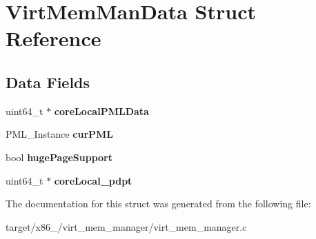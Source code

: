\hypertarget{structVirtMemManData}{}\section{Virt\+Mem\+Man\+Data Struct Reference}
\label{structVirtMemManData}
\subsection*{Data Fields}
\begin{DoxyCompactItemize}
\item 
uint64\+\_\+t $\ast$ {\bfseries core\+Local\+P\+M\+L\+Data}\hypertarget{structVirtMemManData_a468d6712e9cdfa8e18c9d2a56d654d37}{}\label{structVirtMemManData_a468d6712e9cdfa8e18c9d2a56d654d37}

\item 
P\+M\+L\+\_\+\+Instance {\bfseries cur\+P\+ML}\hypertarget{structVirtMemManData_a111b9e337a5396ad0d0145f99e18e4ae}{}\label{structVirtMemManData_a111b9e337a5396ad0d0145f99e18e4ae}

\item 
bool {\bfseries huge\+Page\+Support}\hypertarget{structVirtMemManData_aa959c3d84d60b56aa7e36c4427b97ac9}{}\label{structVirtMemManData_aa959c3d84d60b56aa7e36c4427b97ac9}

\item 
uint64\+\_\+t $\ast$ {\bfseries core\+Local\+\_\+pdpt}\hypertarget{structVirtMemManData_af9efe0622f3be7d5b77f156ede5f1650}{}\label{structVirtMemManData_af9efe0622f3be7d5b77f156ede5f1650}

\end{DoxyCompactItemize}


The documentation for this struct was generated from the following file\+:\begin{DoxyCompactItemize}
\item 
target/x86\+\_/virt\+\_\+mem\+\_\+manager/virt\+\_\+mem\+\_\+manager.\+c\end{DoxyCompactItemize}

